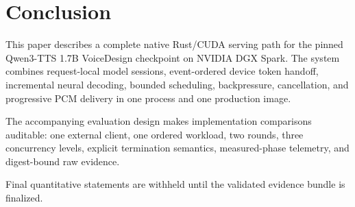 \section{Conclusion}

This paper describes a complete native Rust/CUDA serving path for the pinned
Qwen3-TTS 1.7B VoiceDesign checkpoint on NVIDIA DGX Spark. The system combines
request-local model sessions, event-ordered device token handoff, incremental
neural decoding, bounded scheduling, backpressure, cancellation, and
progressive PCM delivery in one process and one production image.

The accompanying evaluation design makes implementation comparisons auditable:
one external client, one ordered workload, two rounds, three concurrency
levels, explicit termination semantics, measured-phase telemetry, and
digest-bound raw evidence.

\ifFinalEvidenceAvailable
  \VerifiedConclusionResult
\else
  Final quantitative statements are withheld until the validated evidence
  bundle is finalized.
\fi
